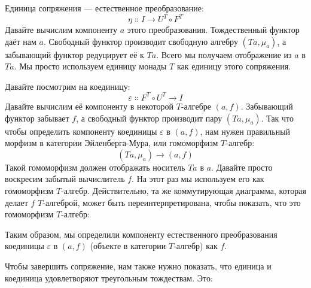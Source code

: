 Единица сопряжения --- естественное преобразование:
\[\eta \Colon I \to U^T \circ F^T\]
Давайте вычислим компоненту $a$ этого преобразования.
Тождественный функтор даёт нам $a$. Свободный функтор производит свободную
алгебру $(T a, \mu_a)$, а забывающий функтор редуцирует её к
$T a$. Всего мы получаем отображение из $a$ в
$T a$. Мы просто используем единицу монады $T$ как
единицу этого сопряжения.

Давайте посмотрим на коединицу:
\[\varepsilon \Colon F^T \circ U^T \to I\]
Давайте вычислим её компоненту в некоторой $T$-алгебре $(a, f)$.
Забывающий функтор забывает $f$, а свободный функтор производит
пару $(T a, \mu_a)$. Так что чтобы определить компоненту
коединицы $\varepsilon$ в $(a, f)$, нам нужен правильный морфизм в
категории Эйленберга-Мура, или гомоморфизм $T$-алгебр:
\[(T a, \mu_a) \to (a, f)\]
Такой гомоморфизм должен отображать носитель $T a$ в $a$.
Давайте просто воскресим забытый вычислитель $f$. На этот раз мы
используем его как гомоморфизм $T$-алгебр. Действительно, та же коммутирующая
диаграмма, которая делает $f$ $T$-алгеброй, может быть переинтерпретирована, чтобы показать,
что это гомоморфизм $T$-алгебр:

\begin{figure}[H]
  \centering
\end{figure}

\noindent
Таким образом, мы определили компоненту естественного преобразования коединицы
$\varepsilon$ в $(a, f)$ (объекте в категории $T$-алгебр)
как $f$.

Чтобы завершить сопряжение, нам также нужно показать, что единица и
коединица удовлетворяют треугольным тождествам. Это:

\begin{figure}[H]
  \centering
  \begin{subfigure}
    \centering
  \end{subfigure}%
  \hspace{1cm}
  \begin{subfigure}
    \centering
  \end{subfigure}
\end{figure}

